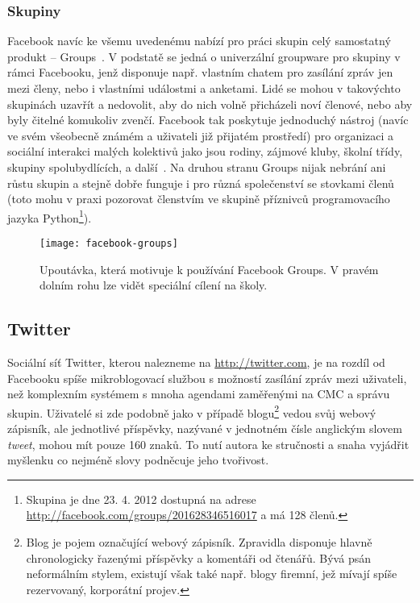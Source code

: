 \documentclass[12pt,oneside,final]{fithesis2}
\begin{document}
\subsubsection*{Skupiny}
Facebook navíc ke všemu uvedenému nabízí pro práci skupin celý samostatný produkt -- Groups~\cite{chai2010new}. V podstatě se jedná o univerzální groupware pro skupiny v rámci Facebooku, jenž disponuje např. vlastním chatem pro zasílání zpráv jen mezi členy, nebo i vlastními událostmi a anketami. Lidé se mohou v takovýchto skupinách uzavřít a nedovolit, aby do nich volně přicházeli noví členové, nebo aby byly čitelné komukoliv zvenčí. Facebook tak poskytuje jednoduchý nástroj (navíc ve svém všeobecně známém a uživateli již přijatém prostředí) pro organizaci a sociální interakci malých kolektivů jako jsou rodiny, zájmové kluby, školní třídy, skupiny spolubydlících, a další~\cite{novati2012introducing}. Na druhou stranu Groups nijak nebrání ani růstu skupin a stejně dobře funguje i pro různá společenství se stovkami členů (toto mohu v praxi pozorovat členstvím ve skupině příznivců programovacího jazyka Python\footnote{Skupina je dne 23. 4. 2012 dostupná na adrese \url{http://facebook.com/groups/201628346516017} a má 128 členů.}).

\begin{figure}[H]
    \texttt{[image: facebook-groups]}
    \caption{Upoutávka, která motivuje k používání Facebook Groups. V pravém dolním rohu lze vidět speciální cílení na školy.}
\end{figure}

\subsection{Twitter}\label{twitter}
Sociální síť Twitter, kterou nalezneme na \url{http://twitter.com}, je na rozdíl od Facebooku spíše mikroblogovací službou s možností zasílání zpráv mezi uživateli, než komplexním systémem s mnoha agendami zaměřenými na CMC a správu skupin. Uživatelé si zde podobně jako v případě blogu\footnote{Blog je pojem označující webový zápisník. Zpravidla disponuje hlavně chronologicky řazenými příspěvky a komentáři od čtenářů. Bývá psán neformálním stylem, existují však také např. blogy firemní, jež mívají spíše rezervovaný, korporátní projev.} vedou svůj webový zápisník, ale jednotlivé příspěvky, nazývané v jednotném čísle anglickým slovem \emph{tweet}, mohou mít pouze 160 znaků. To nutí autora ke stručnosti a snaha vyjádřit myšlenku co nejméně slovy podněcuje jeho tvořivost.
\end{document}
